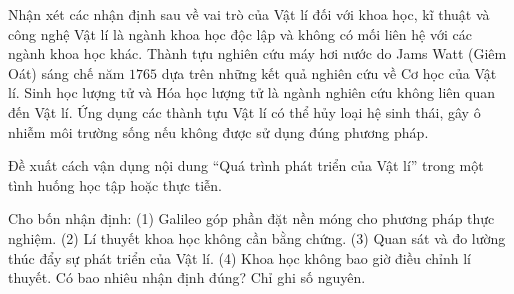 \begin{ex}
Nhận xét các nhận định sau về vai trò của Vật lí đối với khoa học, kĩ thuật và công nghệ
\choiceTF
{Vật lí là ngành khoa học độc lập và không có mối liên hệ với các ngành khoa học khác.}
{Thành tựu nghiên cứu máy hơi nước do Jams Watt (Giêm Oát) sáng chế năm $1765$ dựa trên những kết quả nghiên cứu về Cơ học của Vật lí.}
{Sinh học lượng tử và Hóa học lượng tử là ngành nghiên cứu không liên quan đến Vật lí.}
{\True Ứng dụng các thành tựu Vật lí có thể hủy loại hệ sinh thái, gây ô nhiễm môi trường sống nếu không được sử dụng đúng phương pháp.}
\end{ex}

\begin{bt}
Đề xuất cách vận dụng nội dung “Quá trình phát triển của Vật lí” trong một tình huống học tập hoặc thực tiễn.
\end{bt}

\begin{ex}
Cho bốn nhận định: (1) Galileo góp phần đặt nền móng cho phương pháp thực nghiệm. (2) Lí thuyết khoa học không cần bằng chứng. (3) Quan sát và đo lường thúc đẩy sự phát triển của Vật lí. (4) Khoa học không bao giờ điều chỉnh lí thuyết. Có bao nhiêu nhận định đúng? Chỉ ghi số nguyên.
\end{ex}

